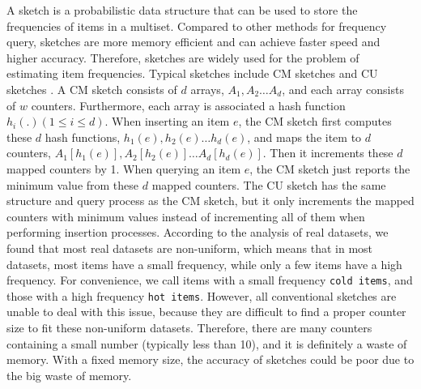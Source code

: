 A sketch is a probabilistic data structure that can be used to store the frequencies of items in a multiset. 
Compared to other methods for frequency query, sketches are more memory efficient and can achieve faster speed and higher accuracy.
Therefore, sketches are widely used for the problem of estimating item frequencies.
Typical sketches include CM sketches \cite{cormode2005an} and CU sketches \cite{estan2001new}. A CM sketch consists of $d$ arrays, $A_1, A_2 \dots A_d$, and each array consists of $w$ counters. Furthermore, each array is associated a hash function $h_i(.) (1\leqslant i\leqslant d)$.
When inserting an item $e$, the CM sketch first computes these $d$ hash functions, $h_1(e), h_2(e) \dots h_d(e)$, and maps the item to $d$ counters, $A_1[h_1(e)], A_2[h_2(e)] \dots A_d[h_d(e)]$. Then it increments these $d$ mapped counters by 1.
When querying an item $e$, the CM sketch just reports the minimum value from these $d$ mapped counters.
The CU sketch has the same structure and query process as the CM sketch, but it only increments the mapped counters with minimum values instead of incrementing all of them when performing insertion processes.
According to the analysis of real datasets, we found that most real datasets are non-uniform, which means that in most datasets, most items have a small frequency, while only a few items have a high frequency.
For convenience, we call items with a small frequency \texttt{cold items}, and those with a high frequency \texttt{hot items}.
However, all conventional sketches are unable to deal with this issue, because they are difficult to find a proper counter size to fit these non-uniform datasets.
Therefore, there are many counters containing a small number (typically less than 10), and it is definitely a waste of memory.
With a fixed memory size, the accuracy of sketches could be poor due to the big waste of memory.

